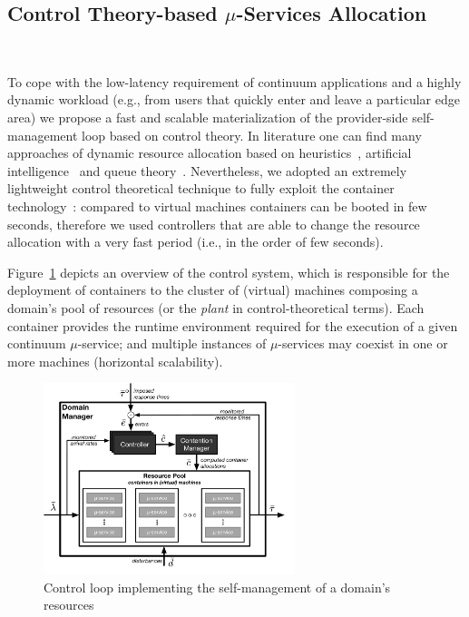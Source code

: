 
\subsection{Control Theory-based $\mu$-Services Allocation}~\label{sec:ps_allocation}

To cope with the low-latency requirement of continuum applications and a highly dynamic workload  (e.g., from users that quickly enter and leave a particular edge area) we 
propose a fast and scalable materialization of the provider-side self-management loop based on control theory. In literature one can find many approaches of dynamic resource allocation based on heuristics~\cite{dustdar0}, artificial intelligence~\cite{ia1} and queue theory~\cite{queue1}. Nevertheless, we adopted an extremely lightweight control theoretical technique to fully exploit the container technology~\cite{Quatrocchi2016discrete}: compared to virtual machines containers can be booted in few seconds, therefore we used controllers that are able to change the resource allocation with a very fast period (i.e., in the order of few seconds).

Figure~\ref{fig:A3Edomain-manager} depicts an overview of the control system, which is responsible for the deployment of containers to the cluster of (virtual) machines composing a domain's pool of resources (or the \textit{plant} in control-theoretical terms). Each container provides the runtime environment required for the execution of a given continuum $\mu$-service; and multiple instances of $\mu$-services may coexist in one or more machines (horizontal scalability).

\begin{figure}[tbp]
	\includegraphics[width=0.65\textwidth]{figs/domain-manager-allocation}
	\caption{Control loop implementing the self-management of a domain's resources}
	\label{fig:A3Edomain-manager}
\end{figure}

